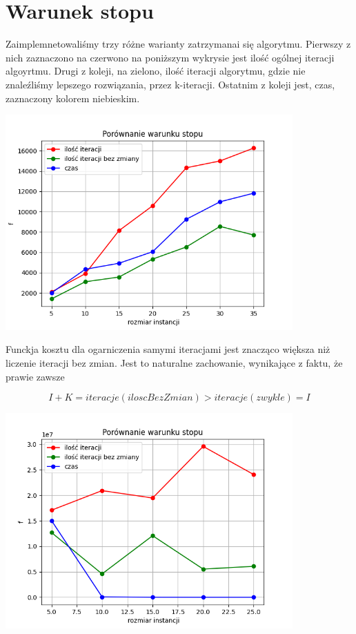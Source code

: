 \documentclass{article}
\begin{document}
    \section{Warunek stopu}

    Zaimplemnetowaliśmy trzy różne warianty zatrzymanai się algorytmu.
    Pierwszy z nich zaznaczono na czerwono na poniższym wykrysie jest ilość ogólnej
    iteracji algoyrtmu. Drugi z koleji, na zielono, ilość iteracji algorytmu, gdzie
    nie znaleźliśmy lepszego rozwiązania, przez k-iteracji. Ostatnim z koleji jest, czas,
    zaznaczony kolorem niebieskim.

    \includegraphics[width=11cm]{./spr2img/Figure_8.png}

    Funckja kosztu dla ogarniczenia samymi iteracjami jest znacząco większa niż liczenie
    iteracji bez zmian. Jest to naturalne zachowanie, wynikające z faktu, że prawie zawsze

    $$I + K = iteracje(iloscBezZmian) > iteracje(zwykle) = I$$

    \includegraphics[width=11cm]{./spr2img/Figure_10.png}
    
\end{document}
